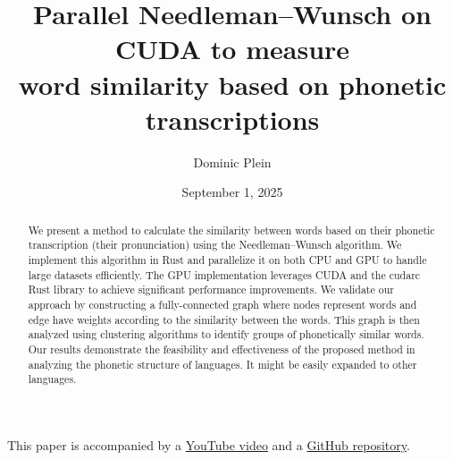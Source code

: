 \documentclass[10pt,a4paper,english]{article}
\title{\vspace{-0.0em}Parallel Needleman–Wunsch on CUDA to measure\\
word similarity based on phonetic transcriptions}
\author{Dominic Plein}
\date{September 1, 2025}
\newcommand{\abstractText}{\noindent
	\newline\noindent
    We present a method to calculate the similarity between words based on their phonetic transcription (their pronunciation) using the Needleman–Wunsch algorithm. We implement this algorithm in Rust and parallelize it on both CPU and GPU to handle large datasets efficiently. The GPU implementation leverages CUDA and the cudarc Rust library to achieve significant performance improvements. We validate our approach by constructing a fully-connected graph where nodes represent words and edge have weights according to the similarity between the words. This graph is then analyzed using clustering algorithms to identify groups of phonetically similar words. Our results demonstrate the feasibility and effectiveness of the proposed method in analyzing the phonetic structure of languages. It might be easily expanded to other languages.
}
\begin{document}
\setlength{\abovedisplayskip}{0.2em}

\maketitle

\begin{abstract}
    \abstractText
    \newline
    \newline
\end{abstract}

\vspace{-2em}
\begin{center}
    This paper is accompanied by a \href{https://youtu.be/xbcpnItE3_4}{YouTube video} and a \href{https://github.com/Splines/phonetics-graph/}{GitHub repository}.
\end{center}

\vspace{2em}

\begin{multicols*}{2}
\tableofcontents

\newcolumn







\renewcommand*{\glsgroupskip}{} %
\printglossary[type=\acronymtype]
\end{multicols*}

\printbibliography[
    heading=bibintoc,
    title={Bibliography},
    keyword={lit}
]
\printbibliography[
    title={Data sources \& Tools},
    keyword={data}
]
\end{document}
